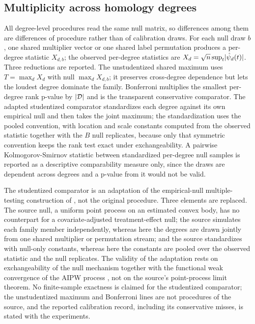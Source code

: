 \subsection{Multiplicity across homology degrees}

All degree-level procedures read the same null matrix, so differences among them are differences
of procedure rather than of calibration draws. For each null draw $b$, one shared multiplier
vector or one shared label permutation produces a per-degree statistic $X_{d,b}$; the observed
per-degree statistics are $X_d = \sqrt n \sup_t \lvert \hat\psi_d(t)\rvert$. Three reductions are
reported. The unstudentized shared maximum uses $T = \max_d X_d$ with null $\max_d X_{d,b}$; it
preserves cross-degree dependence but lets the loudest degree dominate the family. Bonferroni
multiplies the smallest per-degree rank p-value by $\lvert \mathcal D\rvert$ and is the transparent
conservative comparator. The adapted studentized comparator standardizes each degree against its
own empirical null and then takes the joint maximum; the standardization uses the pooled
convention, with location and scale constants computed from the observed statistic together with
the $B$ null replicates, because only that symmetric convention keeps the rank test exact under
exchangeability. A pairwise Kolmogorov-Smirnov statistic between standardized per-degree null
samples is reported as a descriptive comparability measure only, since the draws are dependent
across degrees and a p-value from it would not be valid.

The studentized comparator is an adaptation of the empirical-null multiple-testing construction of
\cite{vejdemo_mukherjee_2022}, not the original procedure. Three elements are replaced. The source
null, a uniform point process on an estimated convex body, has no counterpart for a
covariate-adjusted treatment-effect null; the source simulates each family member independently,
whereas here the degrees are drawn jointly from one shared multiplier or permutation stream; and
the source standardizes with null-only constants, whereas here the constants are pooled over the
observed statistic and the null replicates. The validity of the adaptation rests on exchangeability
of the null mechanism together with the functional weak convergence of the AIPW process
\cite{kim_lee_tce_2026}, not on the source's point-process limit theorem. No finite-sample
exactness is claimed for the studentized comparator; the unstudentized maximum and Bonferroni
lines are not procedures of the source, and the reported calibration record, including its
conservative misses, is stated with the experiments.

